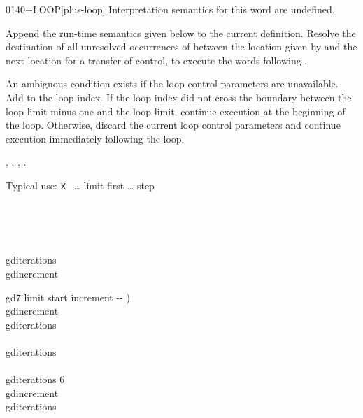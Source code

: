 \vspace*{-2ex}
\begin{worddef}{0140}{+LOOP}[plus-loop]
\interpret
	Interpretation semantics for this word are undefined.

\compile

	Append the run-time semantics given below to the current
	definition. Resolve the destination of all unresolved
	occurrences of  between the location given
	by  and the next location for a transfer of
	control, to execute the words following .

\runtime

	An ambiguous condition exists if the loop control parameters
	are unavailable. Add  to the loop index. If the loop
	index did not cross the boundary between the loop limit minus
	one and the loop limit, continue execution at the beginning
	of the loop. Otherwise, discard the current loop control
	parameters and continue execution immediately following the
	loop.

\see {},
	,
	,
	.

	\begin{rationale} %
		Typical use:
			\word{:} \texttt{X} ~{\ldots} limit first 
				{\ldots} step 
			\word{;}
	\end{rationale}

	\begin{testing} %
		\ttfamily
		 \\
		 \\
		 \\

		 gditerations \\
		 gdincrement

		\word{:} gd7  limit start increment -{}- ) \\
		\tab gdincrement \word{!} \\
		 gditerations \word{!} \\
		\tab {} \\
		 gditerations \word{+!} \\
		\tab[2]  \\
		\tab[2] gditerations   6 \word{=}    \\
		\tab[2] gdincrement  \\
		\tab {} gditerations  \\
		\word{;}


\end{testing}
\end{worddef}
